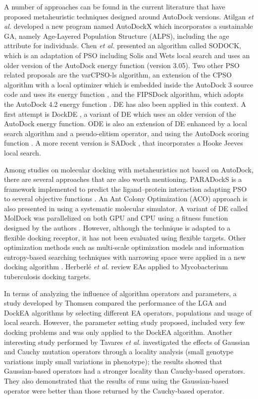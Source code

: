 A number of approaches can be found in the current literature that have proposed metaheuristic techniques designed around AutoDock versions. Atilgan \emph{et al.} \cite{Atilgan2010} developed a new program named AutoDockX which incorporates a sustainable GA, namely Age-Layered Population Structure (ALPS), including the age attribute for individuals. Chen \emph{et al.} \cite{Chen2007} presented an algorithm called SODOCK, which is an adaptation of PSO including Solis and Wets local search and uses an older version of the AutoDock energy function (version 3.05). Two other PSO related proposals are the varCPSO-ls algorithm, an extension of the CPSO algorithm with a local optimizer which is embedded inside the AutoDock 3 source code and uses its energy function \cite{Namasivayam2007}, and the FIPSDock algorithm, which adopts the AutoDock 4.2 energy function \cite{Liu2012}. DE has also been applied in this context. A first attempt is DockDE \cite{Thomsen2003DE}, a variant of DE which uses an older version of the AutoDock energy function. ODE is also an extension of DE enhanced by a local search algorithm and a pseudo-elitism operator, and using the AutoDock scoring function \cite{Koohi-Moghadam2012}. A more recent version is SADock \cite{HwanWon2013}, that incorporates a Hooke Jeeves local search.

Among studies on molecular docking with metaheuristics not based on AutoDock, there are several approaches that are also worth mentioning. PARADockS is a framework implemented to predict the ligand–protein interaction adapting PSO to several objective functions \cite{Meier2010}. An Ant Colony Optimization (ACO) approach is also presented in \cite{Korb2006} using a systematic molecular simulator. A variant of DE called MolDock was parallelized on both GPU and CPU using a fitness function designed by the authors \cite{Simonsen2011}. However, although the technique is adapted to a flexible docking receptor, it has not been evaluated using flexible targets. Other optimization methods such as multi-scale optimization models and information entropy-based searching techniques with narrowing space were applied in a new docking algorithm \cite{Kang2012}. Herberlé \emph{et al.} \cite{Herberle2010} review EAs applied to Mycobacterium tuberculosis docking targets.

In terms of analyzing the influence of algorithm operators and parameters, a study developed by Thomsen \cite{Thomsen2003Evolutionary} compared the performance of the LGA and DockEA algorithms by selecting different EA operators, populations and usage of local search. However, the parameter setting study proposed, included very few docking problems and was only applied to the DockEA algorithm. Another interesting study performed by Tavares \emph{et al.} \cite{Tavares2008} investigated the effects of Gaussian and Cauchy mutation operators through a locality analysis (small genotype variations imply small variations in phenotype); the results showed that Gaussian-based operators had a stronger locality than Cauchy-based operators. They also demonstrated that the results of runs using the Gaussian-based operator were better than those returned by the Cauchy-based operator.


